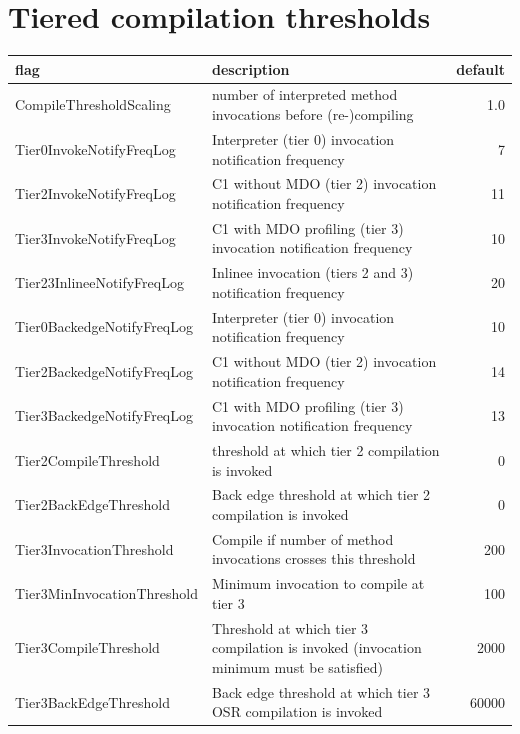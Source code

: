 \newpage
\section{Tiered compilation thresholds}
\label{a:compilethresholds}
\begin{table}[h]
  \centering
  \label{t:compilethresholds}
  \begin{center}
    \begin{tabular}{| l | p{9.0cm} | r | }
       \hline
       \textbf{flag} & \textbf{description} & \textbf{default} \\ \hline\hline
       CompileThresholdScaling & number of interpreted method invocations before (re-)compiling & 1.0\\ \hline
       Tier0InvokeNotifyFreqLog & Interpreter (tier 0) invocation notification frequency & 7\\ \hline
       Tier2InvokeNotifyFreqLog & C1 without MDO (tier 2) invocation notification frequency & 11 \\ \hline
       Tier3InvokeNotifyFreqLog & C1 with MDO profiling (tier 3) invocation notification frequency & 10 \\ \hline
       Tier23InlineeNotifyFreqLog & Inlinee invocation (tiers 2 and 3) notification frequency & 20 \\ \hline
       Tier0BackedgeNotifyFreqLog & Interpreter (tier 0) invocation notification frequency & 10 \\ \hline
       Tier2BackedgeNotifyFreqLog & C1 without MDO (tier 2) invocation notification frequency & 14 \\ \hline
       Tier3BackedgeNotifyFreqLog & C1 with MDO profiling (tier 3) invocation notification frequency & 13 \\ \hline
       Tier2CompileThreshold & threshold at which tier 2 compilation is invoked & 0 \\ \hline
       Tier2BackEdgeThreshold & Back edge threshold at which tier 2 compilation is invoked & 0 \\ \hline
       Tier3InvocationThreshold & Compile if number of method invocations crosses this threshold & 200 \\ \hline
       Tier3MinInvocationThreshold & Minimum invocation to compile at tier 3 & 100 \\ \hline
       Tier3CompileThreshold & Threshold at which tier 3 compilation is invoked (invocation minimum must be satisfied) & 2000 \\ \hline
       Tier3BackEdgeThreshold & Back edge threshold at which tier 3 OSR compilation is invoked & 60000 \\ \hline

\end{tabular}
\end{center}
\end{table}
